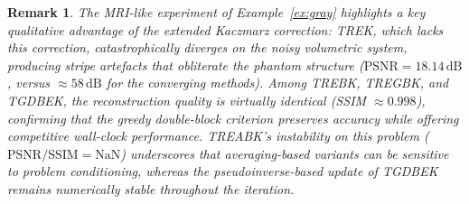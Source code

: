 \documentclass[11pt]{article}
\newtheorem{remark}[theorem]{Remark}
\begin{document}
\begin{remark}
The MRI-like experiment of Example~\ref{ex:gray} highlights a key qualitative advantage of the extended Kaczmarz correction: TREK, which lacks this correction, catastrophically diverges on the noisy volumetric system, producing stripe artefacts that obliterate the phantom structure ($\mathrm{PSNR}=18.14\,\mathrm{dB}$, versus $\approx58\,\mathrm{dB}$ for the converging methods). Among TREBK, TREGBK, and TGDBEK, the reconstruction quality is virtually identical (SSIM $\approx 0.998$), confirming that the greedy double-block criterion preserves accuracy while offering competitive wall-clock performance. TREABK's instability on this problem ($\mathrm{PSNR/SSIM}=\mathrm{NaN}$) underscores that averaging-based variants can be sensitive to problem conditioning, whereas the pseudoinverse-based update of TGDBEK remains numerically stable throughout the iteration.
\end{remark}
\end{document}
